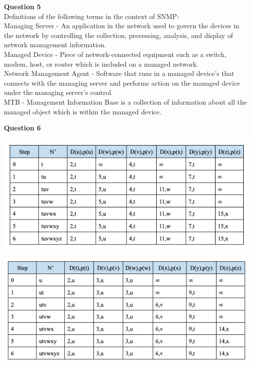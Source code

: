 \documentclass{article}
\begin{document}
\pagebreak
{\bf Question 5}\\
Definitions of the following terms in the context of SNMP:\\

Managing Server - An application in the network used to govern the devices in the network by controlling the collection, processing, analysis, and display of network management information.\\

Managed Device - Piece of network-connected equipment such as a switch, modem, host, or router which is included on a managed network.\\

Network Management Agent - Software that runs in a managed device's that connects with the managing server and performs action on the managed device under the managing server's control. \\

MTB - Management Information Base is a collection of information about all the managed object which is within the managed device.

\bigskip
{\bf Question 6}
\begin{center}
    \includegraphics[width=1\textwidth]{6-1.png}
\end{center}

\begin{center}
    \includegraphics[width=1\textwidth]{6-2.png}
\end{center}
\end{document}
